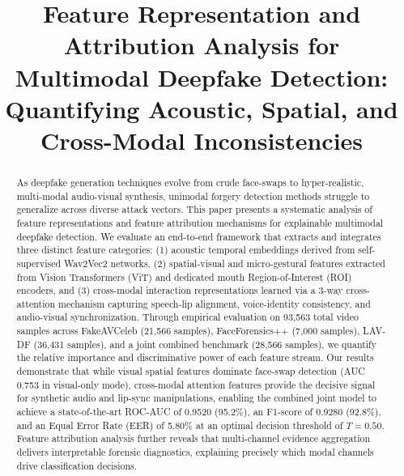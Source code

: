 \documentclass[conference]{IEEEtran}
\begin{document}
\title{Feature Representation and Attribution Analysis for Multimodal Deepfake Detection: Quantifying Acoustic, Spatial, and Cross-Modal Inconsistencies\\
}

\author{
}

\maketitle

\begin{abstract}
As deepfake generation techniques evolve from crude face-swaps to hyper-realistic, multi-modal audio-visual synthesis, unimodal forgery detection methods struggle to generalize across diverse attack vectors. This paper presents a systematic analysis of feature representations and feature attribution mechanisms for explainable multimodal deepfake detection. We evaluate an end-to-end framework that extracts and integrates three distinct feature categories: (1) acoustic temporal embeddings derived from self-supervised Wav2Vec2 networks, (2) spatial-visual and micro-gestural features extracted from Vision Transformers (ViT) and dedicated mouth Region-of-Interest (ROI) encoders, and (3) cross-modal interaction representations learned via a 3-way cross-attention mechanism capturing speech-lip alignment, voice-identity consistency, and audio-visual synchronization. Through empirical evaluation on 93,563 total video samples across FakeAVCeleb (21,566 samples), FaceForensics++ (7,000 samples), LAV-DF (36,431 samples), and a joint combined benchmark (28,566 samples), we quantify the relative importance and discriminative power of each feature stream. Our results demonstrate that while visual spatial features dominate face-swap detection (AUC 0.753 in visual-only mode), cross-modal attention features provide the decisive signal for synthetic audio and lip-sync manipulations, enabling the combined joint model to achieve a state-of-the-art ROC-AUC of 0.9520 (95.2\%), an F1-score of 0.9280 (92.8\%), and an Equal Error Rate (EER) of 5.80\% at an optimal decision threshold of $T = 0.50$. Feature attribution analysis further reveals that multi-channel evidence aggregation delivers interpretable forensic diagnostics, explaining precisely which modal channels drive classification decisions.
\end{abstract}
\end{document}
